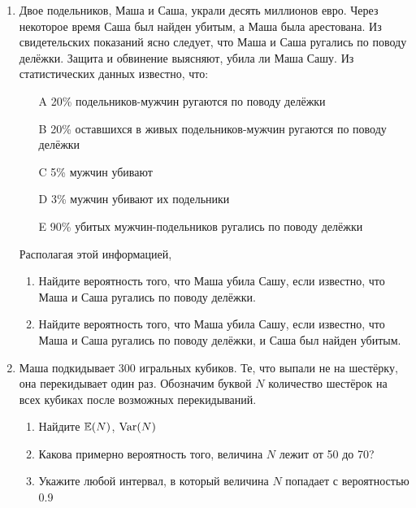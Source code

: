 \documentclass[12pt, a4paper]{article}\usepackage[]{graphicx}\usepackage[]{color}
\begin{document}
				\begin{enumerate}
					\item Двое подельников, Маша и Саша, украли десять миллионов евро. Через некоторое время Саша был найден убитым, а Маша была арестована. Из свидетельских показаний ясно следует, что Маша и Саша ругались по поводу делёжки. Защита и обвинение выясняют, убила ли Маша Сашу. Из статистических данных известно, что:
					\begin{enumerate}
						\item[A] 20\% подельников-мужчин ругаются по поводу делёжки
						\item[B] 20\% оставшихся в живых подельников-мужчин ругаются по поводу делёжки
						\item[C] 5\% мужчин убивают
						\item[D] 3\% мужчин убивают их подельники
						\item[E] 90\% убитых мужчин-подельников ругались по поводу делёжки
					\end{enumerate}
					Располагая этой информацией,
					\begin{enumerate}
						\item Найдите вероятность того, что Маша убила Сашу, если известно, что Маша и Саша ругались по поводу делёжки.
						\item Найдите вероятность того, что Маша убила Сашу, если известно, что Маша и Саша ругались по поводу делёжки, и Саша был найден убитым.
					\end{enumerate}


					\item Маша подкидывает 300 игральных кубиков. Те, что выпали не на шестёрку, она перекидывает один раз. Обозначим буквой $N$ количество шестёрок на всех кубиках после возможных перекидываний.
					\begin{enumerate}
						\item Найдите $\mathbb{E}(N)$, $\operatorname{Var}(N)$
						\item Какова примерно вероятность того, величина $N$ лежит от 50 до 70?
						\item Укажите любой интервал, в который величина $N$ попадает с вероятностью 0.9
					\end{enumerate}


\end{enumerate}
\end{document}

